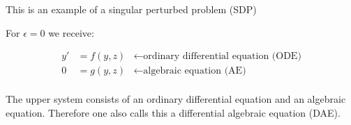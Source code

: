 \begin{example}
	This is an example of a singular perturbed problem (SDP)

  For $\epsilon = 0$ we receive:

  \begin{equation}\begin{array}{lll}
    y' & = f(y,z) & \leftarrow \text{ordinary differential equation (ODE)} \\
    0 & = g(y,z) & \leftarrow \text{algebraic equation (AE)}\\ 
  \end{array}\end{equation}

	The upper system consists of an ordinary differential equation and an algebraic 
	equation. Therefore one also calls this a differential algebraic equation
	(DAE).
\end{example}


